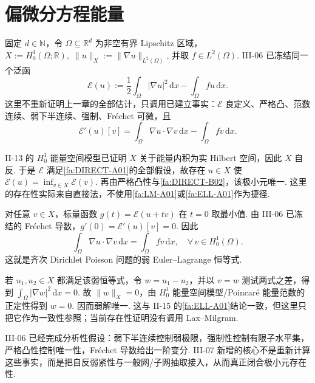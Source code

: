 \section{偏微分方程能量}\label{sec:iii07-pde-energy}
\begingroup
{}
\begin{FAApplication}[椭圆能量的直接法存在性]
固定 \(\displaystyle d\in\mathbb N\)，令 \(\displaystyle\Omega\subseteq\mathbb R^d\) 为非空有界 Lipschitz 区域，
\(\displaystyle X:=H_0^1(\Omega;\mathbb R), \; \|u\|_X:=\|\nabla u\|_{L^2(\Omega)}\),
并取 \(\displaystyle f\in L^2(\Omega)\). III-06 已冻结同一个泛函
\[
\mathcal E(u)
:=
\frac{1}{2}\int_\Omega|\nabla u|^2\,\mathrm{d}x
-
\int_\Omega fu\,\mathrm{d}x.
\]
这里不重新证明上一章的全部估计，只调用已建立事实：\(\displaystyle\mathcal E\) 良定义、严格凸、范数连续、弱下半连续、强制、Fréchet 可微，且
\[
\mathcal E'(u)[v]
=
\int_\Omega\nabla u\cdot\nabla v\,\mathrm{d}x
-
\int_\Omega fv\,\mathrm{d}x.
\]

II-13 的 \(\displaystyle H_0^1\) 能量空间模型已证明 \(\displaystyle X\) 关于能量内积为实 Hilbert 空间，因此 \(\displaystyle X\) 自反. 于是 \(\displaystyle\mathcal E\) 满足\autoref{fa:DIRECT-A01}的全部假设，故存在 \(\displaystyle u\in X\) 使
\(\displaystyle \mathcal E(u) = \inf_{v\in X}\mathcal E(v)\).
再由严格凸性与\autoref{fa:DIRECT-B02}，该极小元唯一. 这里的存在性实际来自直接法，不使用\autoref{fa:LM-A01}或\autoref{fa:ELL-A01}作为捷径.

对任意 \(\displaystyle v\in X\)，标量函数 \(\displaystyle g(t)=\mathcal E(u+tv)\) 在 \(\displaystyle t=0\) 取最小值. 由 III-06 已冻结的 Fréchet 导数，\(\displaystyle g'(0)=\mathcal E'(u)[v]=0\). 因此
\[
\int_\Omega
\nabla u\cdot\nabla v
\,\mathrm{d}x
=
\int_\Omega
fv
\,\mathrm{d}x,
\quad
\forall\,v\in H_0^1(\Omega).
\]
这就是齐次 Dirichlet Poisson 问题的弱 Euler--Lagrange 恒等式.

若 \(\displaystyle u_1,u_2\in X\) 都满足该弱恒等式，令 \(\displaystyle w=u_1-u_2\)，并以 \(\displaystyle v=w\) 测试两式之差，得到
\(\displaystyle \int_\Omega|\nabla w|^2\,\mathrm{d}x=0\).
故 \(\displaystyle\|w\|_X=0\)，由 \(\displaystyle H_0^1\) 能量空间模型/Poincaré 能量范数的正定性得到 \(\displaystyle w=0\). 因而弱解唯一. 这与 II-15 的\autoref{fa:ELL-A01}结论一致，但这里只把它作为一致性参照；当前存在性证明没有调用 Lax--Milgram.
\end{FAApplication}
\endgroup

\begin{FARemark}
III-06 已经完成分析性假设：弱下半连续控制弱极限，强制性控制有限子水平集，严格凸性控制唯一性，Fréchet 导数给出一阶变分. III-07 新增的核心不是重新计算这些事实，而是把自反弱紧性与一般网/子网抽取接入，从而真正闭合极小元存在性.
\end{FARemark}

